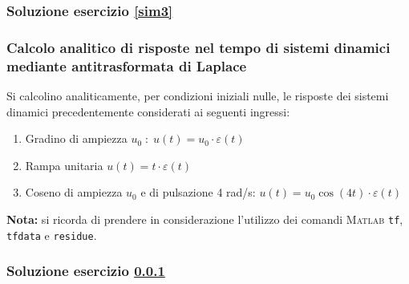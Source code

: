 \documentclass[../main.tex]{subfiles}
\begin{document}
\subsubsection*{Soluzione esercizio \ref{sim3}}








\vspace*{1cm}
\subsubsection{Calcolo analitico di risposte nel tempo di sistemi dinamici mediante antitrasformata di Laplace}
\label{sim4}

Si calcolino analiticamente, per condizioni iniziali nulle, le risposte dei sistemi dinamici precedentemente considerati ai seguenti ingressi:

\begin{enumerate}[label=\textbf{-}]
	\item Gradino di ampiezza $u_0\;:\;u(t) = u_0 \cdot \varepsilon (t)$
	\item Rampa unitaria $u(t) = t \cdot \varepsilon (t)$
	\item Coseno di ampiezza $u_0$ e di pulsazione 4 rad/s: $u(t) = u_0 \cos(4t) \cdot \varepsilon (t)$
\end{enumerate}

\textbf{Nota:} si ricorda di prendere in considerazione l'utilizzo dei comandi \textsc{Matlab} \texttt{tf}, \texttt{tfdata} e \texttt{residue}.










\subsubsection*{Soluzione esercizio \ref{sim4}}
\end{document}
